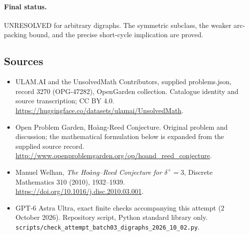 \documentclass[11pt,a4paper]{article}
\begin{document}
\paragraph{Final status.}
UNRESOLVED for arbitrary digraphs. The symmetric subclass, the weaker
arc-packing bound, and the precise short-cycle implication are proved.
\subsection{Sources}
\begin{itemize}
\item[S1] ULAM.AI and the UnsolvedMath Contributors, supplied problems.json, record 3270 (OPG-47282), OpenGarden collection. Catalogue identity and source transcription; CC BY 4.0.
\url{https://huggingface.co/datasets/ulamai/UnsolvedMath}.
\item[S2] Open Problem Garden, Hoàng-Reed Conjecture. Original problem and discussion; the mathematical formulation below is expanded from the supplied source record.
\url{http://www.openproblemgarden.org/op/hoand_reed_conjecture}.
\item[S3] Manuel Welhan, \emph{The Ho\`ang--Reed Conjecture for $\delta^+=3$}, Discrete Mathematics 310 (2010), 1932--1939. \url{https://doi.org/10.1016/j.disc.2010.03.001}.
\item[S9] GPT-6 Astra Ultra, exact finite checks accompanying this attempt (2 October 2026). Repository script, Python standard library only. \texttt{scripts/check\_attempt\_batch03\_digraphs\_2026\_10\_02.py}.
\end{itemize}
\end{document}
